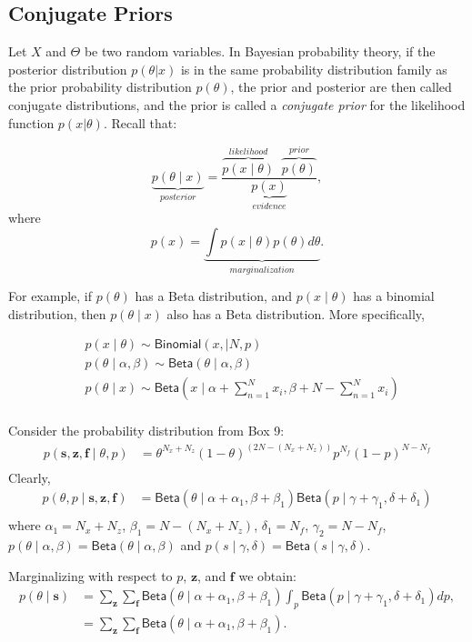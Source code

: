 \documentclass{tufte-handout}
\begin{document}
\subsection{Conjugate Priors}
Let $X$ and $\Theta$ be two random variables. In Bayesian probability theory, if the posterior distribution $p(\theta|x)$ is in the same probability distribution family as the prior probability distribution $p(\theta)$, the prior and posterior are then called conjugate distributions, and the prior is called a {\em conjugate prior} for the likelihood function $p(x| \theta)$. Recall that:

$$ \underbrace{p(\theta \mid  x)}_{posterior} =  \frac{\overbrace{p( x\mid \theta)}^{likelihood} \;\;\overbrace{p(\theta)}^{prior}}{\underbrace{p(x)}_{evidence}}, $$
where
$$ p(x) = \underbrace{\int p( x \mid \theta) p(\theta)d\theta}_{marginalization}.$$ 

For example, if $p(\theta)$ has a Beta distribution, and $p( x\mid \theta)$ has a binomial distribution, then $p(\theta \mid  x)$ also has a Beta distribution. More specifically,

\begin{align*}
& p( x\mid \theta) \sim \textsf{Binomial}(x, \mid N, p)\\
& p(\theta\mid \alpha, \beta) \sim \textsf{Beta}(\theta\mid \alpha, \beta)\\
& p(\theta \mid  x) \sim  \textsf{Beta}(x\mid  \alpha + \sum_{n=1}^N x_i, \beta + N- \sum_{n=1}^N x_i)\\
\end{align*}

Consider the probability distribution from Box 9:
\begin{align*}
p(\mathbf s, \mathbf z, \mathbf f \mid \theta, p) &=  \theta^{N_x + N_z }(1-\theta)^{(2N-(N_x+N_z))} p^{N_f}(1-p)^{N-N_f}\\
\end{align*}
Clearly,
\begin{align*}
p(\theta, p \mid \mathbf s, \mathbf z, \mathbf f ) &= \textsf{Beta}(\theta\mid \alpha + \alpha_1  , \beta + \beta_1 ) \textsf{Beta}(p\mid  \gamma + \gamma_1  , \delta + \delta_1) \\
\end{align*}
where $\alpha_1 =  N_x + N_z$, $\beta_1 = N - (N_x + N_z )$, $\delta_1 = N_f$, $\gamma_2 = N-N_f$,
$p(\theta\mid \alpha, \beta) =  \textsf{Beta}(\theta\mid \alpha, \beta)$ and $p(s\mid \gamma, \delta) = \textsf{Beta}(s\mid \gamma, \delta)$.

Marginalizing with respect to $p$, $\mathbf z$, and $\mathbf f$ we obtain:
\vspace{0.1cm}
\begin{align*}
p(\theta \mid \mathbf s) &= \sum_{\mathbf z}\sum_{\mathbf f}\textsf{Beta}(\theta\mid \alpha + \alpha_1  , \beta + \beta_1 )\int_{p} \textsf{Beta}(p\mid  \gamma + \gamma_1  , \delta + \delta_1) dp, \\
 &= \sum_{\mathbf z}\sum_{\mathbf f}\textsf{Beta}(\theta\mid \alpha + \alpha_1  , \beta + \beta_1 ).
\end{align*}
\end{document}
